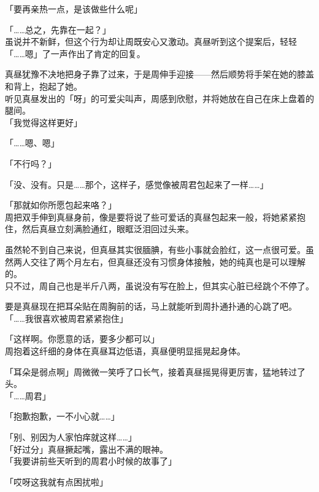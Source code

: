 「要再亲热一点，是该做些什么呢」

「……总之，先靠在一起？」\\

虽说并不新鲜，但这个行为却让周既安心又激动。真昼听到这个提案后，轻轻「……嗯」了一声作出了肯定的回复。

真昼犹豫不决地把身子靠了过来，于是周伸手迎接——然后顺势将手架在她的膝盖和背上，抱起了她。\\

听见真昼发出的「呀」的可爱尖叫声，周感到欣慰，并将她放在自己在床上盘着的腿间。\\

「我觉得这样更好」

「……嗯、嗯」

「不行吗？」

「没、没有。只是……那个，这样子，感觉像被周君包起来了一样……」

「那就如你所愿包起来咯？」\\

周把双手伸到真昼身前，像是要将说了些可爱话的真昼包起来一般，将她紧紧抱住，然后真昼立刻满脸通红，眼眶泛泪回过头来。

虽然轮不到自己来说，但真昼其实很腼腆，有些小事就会脸红，这一点很可爱。虽然两人交往了两个月左右，但真昼还没有习惯身体接触，她的纯真也是可以理解的。\\

只不过，周自己也是半斤八两，虽说没有写在脸上，但其实心脏已经跳个不停了。

要是真昼现在把耳朵贴在周胸前的话，马上就能听到周扑通扑通的心跳了吧。\\

「……我很喜欢被周君紧紧抱住」

「这样啊。你愿意的话，要多少都可以」\\

周抱着这纤细的身体在真昼耳边低语，真昼便明显摇晃起身体。

「耳朵是弱点啊」周微微一笑呼了口长气，接着真昼摇晃得更厉害，猛地转过了头。\\

「……周君」

「抱歉抱歉，一不小心就……」

「别、别因为人家怕痒就这样……」\\

「好过分」真昼撅起嘴，露出不满的眼神。\\

「我要讲前些天听到的周君小时候的故事了」

「哎呀这我就有点困扰啦」\\

